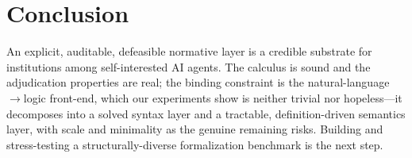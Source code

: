 \documentclass[11pt]{article}
\begin{document}
\section{Conclusion}
An explicit, auditable, defeasible normative layer is a credible substrate for institutions
among self-interested AI agents. The calculus is sound and the adjudication properties are
real; the binding constraint is the natural-language$\rightarrow$logic front-end, which our
experiments show is neither trivial nor hopeless---it decomposes into a solved syntax layer and
a tractable, definition-driven semantics layer, with scale and minimality as the genuine
remaining risks. Building and stress-testing a structurally-diverse formalization benchmark is
the next step.



\end{document}
